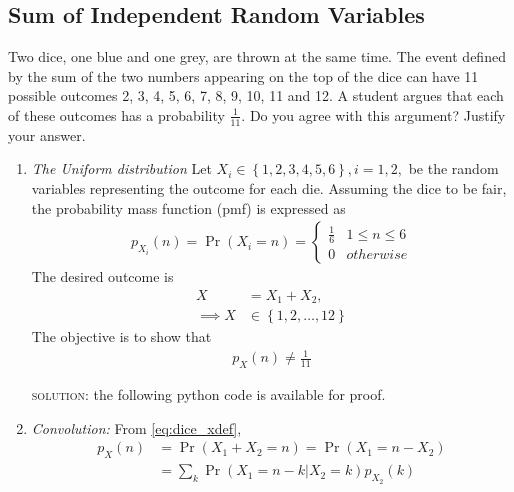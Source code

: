 \documentclass{article}
\numberwithin{equation}{subsection}
\numberwithin{figure}{subsection}
\providecommand{\cbrak}[1]{\ensuremath{\left\{#1\right\}}}
\providecommand{\pr}[1]{\ensuremath{\Pr\left(#1\right)}}
\renewcommand\thesection{\arabic{section}}
\renewcommand\thesubsection{\thesection.\arabic{subsection}}
\begin{document}
\subsection{Sum of Independent Random Variables}
Two dice, one blue and one grey, are thrown at the same time.   The event defined by the sum of the two numbers appearing on the top of the dice can have 11 possible outcomes 2, 3, 4, 5, 6, 7, 8, 9, 10, 11 and 12.  A student argues that each of these outcomes has a probability $\frac{1}{11}$.  Do you agree with this argument?  Justify your answer.
\begin{enumerate}[label=\thesubsection.\arabic*.,ref=\thesubsection.\arabic{figure}]
\item {\em The Uniform distribution} Let $X_i \in \cbrak{1,2,3,4,5,6}, i = 1,2,$ be the random variables representing the outcome for each die.  Assuming the dice to be fair, the probability mass function (pmf) is expressed as 
\begin{align}
\label{eq:dice_pmf_xi}
p_{X_i}(n) = \pr{X_i = n} =
\begin{cases}
\frac{1}{6} & 1 \le n \le 6
\\
0 & otherwise
\end{cases}
\end{align}
The desired outcome is
\begin{align}
\label{eq:dice_xdef}
X &= X_1 + X_2,
\\
\implies X &\in \cbrak{1,2,\dots,12}
\end{align}
The objective is to show that
\begin{align}
p_X(n) \ne \frac{1}{11}
\label{eq:dice_wrong}
\end{align}
\begin{flushleft}
 \textsc{solution:} the following python code is available for proof.
 \end{flushleft}
 \begin{center}
\end{center}
\item {\em Convolution: }
From \eqref{eq:dice_xdef},
\begin{align}
p_X(n) &= \pr{X_1 + X_2 = n} = \pr{X_1  = n -X_2}
\\
&= \sum_{k}^{}\pr{X_1  = n -k | X_2 = k}p_{X_2}(k)
\label{eq:dice_x_sum}
\end{align}

\end{enumerate}
\end{document}
